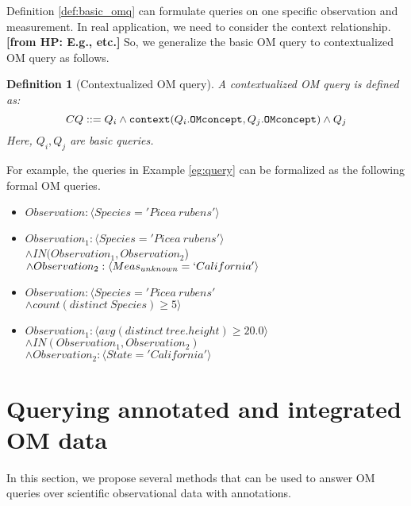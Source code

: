 \documentclass[conference]{IEEEtran}
\newtheorem{example}{\bf Example}[section]
\newtheorem{definition}{\bf Definition}[section]
\newcommand{\from}[2]{{\bf[{\sc from #1:} #2]}}
\begin{document}
Definition \ref{def:basic_omq} can formulate queries on
one specific observation and measurement. 
In real application, we need to consider the context relationship. 
\from{HP}{E.g., etc.}
So, we generalize the basic OM query to contextualized OM query as
follows. 

\begin{definition}[Contextualized OM query]\label{def:context_omq} A
  contextualized OM query is defined as:
\[CQ ::=Q_i \wedge {\tt context}(Q_i.{\tt OMconcept}, Q_j.{\tt
  OMconcept})\wedge Q_j\]
Here, $Q_i, Q_j$ are basic queries.
\end{definition}

For example, the queries in Example \ref{eg:query} can be formalized
as the following formal OM queries. 

\begin{itemize}
\item $Observation: \langle Species='Picea~rubens'\rangle$
\item $Observation_1: \langle Species='Picea~rubens'\rangle$\\
  $\wedge IN(Observation_1, Observation_2$) \\
$\wedge Observation_2: \langle Meas_{unknown}=`California'\rangle$
\item $Observation: \langle Species='Picea~rubens'$\\
$\wedge count(distinct~Species)\geq 5\rangle$
\item $Observation_1: \langle avg(distinct~tree.height)\geq 20.0 \rangle$ 
$\wedge IN(Observation_1, Observation_2)$\\
$\wedge Observation_2: \langle State='California'\rangle$\\
\end{itemize}




\section{Querying annotated and integrated OM data}

In this section, we propose several methods that can be used to
answer OM queries over scientific observational data with
annotations. 
\end{document}

